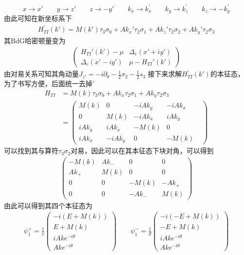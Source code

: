 \documentclass[22pt]{article}
\begin{document}
\begin{equation}
	x \to x' \qquad  y \to z' \qquad z\to -y'   
	\qquad
	k_x \to k_x^{'} \qquad k_y\to k_z^{'} \qquad k_z \to -k_y^{'}
\end{equation}
由此可知在新坐标系下
\begin{align}
	H_{TI}^{'}(k')=M(k')\tau_3\sigma_0+Ak_x'\tau_2\sigma_1+Ak_z'\tau_2\sigma_2+Ak_y'\tau_2\sigma_3
\end{align}
其BdG哈密顿量变为
\begin{align}
	\begin{pmatrix}
	H_{TI}'(k')-\mu  & \Delta_e(x'+iy')\\
	\Delta_e(x'-iy')  & \mu-H_{TI}'(k')
\end{pmatrix}
\end{align}
由对易关系可知其角动量$J_{z'}=-i\partial_{\theta}-\frac{1}{2}\sigma_2-\frac{1}{2}s_3$
接下来求解$H_{TI}^{'}(k')$的本征态，为了书写方便，后面统一去掉$'$
\begin{align}
	H_{TI}&=M(k)\tau_3\sigma_0+Ak_x\tau_2\sigma_1+Ak_y\tau_2\sigma_3\\
	&=
	\begin{pmatrix}
		M(k) &0& -iAk_y & -iAk_x &\\
		0 &M(k) & -iAk_x & iAk_y\\
		iAk_y& iAk_x &-M(k) &0 \\
		iAk_x & -iAk_y &0 &-M(k)
	\end{pmatrix}
\end{align}
可以找到其与算符$\tau_3\sigma_2$对易，因此可以在其本征态下块对角，可以得到
\begin{align}
	\begin{pmatrix}
		-M(k) & Ak_{-} &0&0\\
		Ak_+ &M(k) &0&0 \\
		0&0&-M(k)&-Ak_+\\
		0&0&-Ak_-&M(k)
	\end{pmatrix}
\end{align}
由此可以得到其四个本征态为
\begin{align}
	\psi_{1}^+=
	\frac{1}{c}
	\begin{pmatrix}
		-i(E+M(k))\\
		E+M(k)\\
		iAke^{-i\theta}\\
		Ake^{-i\theta}
	\end{pmatrix}\qquad
	\psi_{1}^-=
	\frac{1}{d}
\begin{pmatrix}
	-i(-E+M(k))\\
	-E+M(k)\\
	iAke^{-i\theta}\\
	Ake^{-i\theta}
\end{pmatrix}
\end{align}
\end{document}
